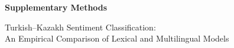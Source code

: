 \documentclass[10pt,a4paper]{article}
\begin{document}
\begin{center}
{\large\bfseries Supplementary Methods}\par\smallskip
Turkish--Kazakh Sentiment Classification:\\
An Empirical Comparison of Lexical and Multilingual Models
\end{center}


\end{document}
